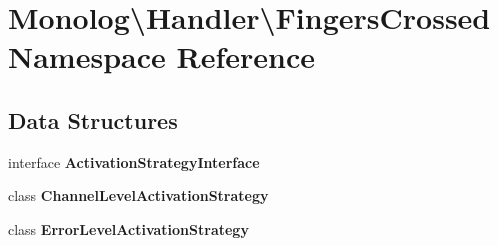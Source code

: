 \section{Monolog\textbackslash{}Handler\textbackslash{}Fingers\+Crossed Namespace Reference}
\label{namespace_monolog_1_1_handler_1_1_fingers_crossed}
\subsection*{Data Structures}
\begin{DoxyCompactItemize}
\item 
interface {\bf Activation\+Strategy\+Interface}
\item 
class {\bf Channel\+Level\+Activation\+Strategy}
\item 
class {\bf Error\+Level\+Activation\+Strategy}
\end{DoxyCompactItemize}
